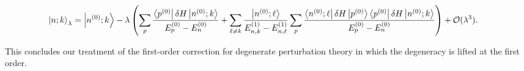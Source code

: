 \begin{align*}
\left| n;k \right\rangle_\lambda &= \left| n^{(0)};k \right\rangle
- \lambda \left( \sum\limits_p \frac{\left\langle p^{(0)} \right|\delta H \left| n^{(0)};k \right\rangle}{E_p^{(0)}-E_n^{(0)}}
+ \sum\limits_{\ell\neq k} \frac{\left| n^{(0)};\ell \right\rangle}{E_{n,k}^{(1)}-E_{n,\ell}^{(1)}} \sum\limits_{p} \frac{\left\langle n^{(0)};\ell \right|\delta H \left| p^{(0)} \right\rangle \left\langle p^{(0)} \right|\delta H\left| n^{(0)};k \right\rangle}{E_p^{(0)}-E_n^{(0)}}
\right) + \mathcal{O} (\lambda^3).
\end{align*}

This concludes our treatment of the first-order correction for degenerate perturbation theory in which the degeneracy is lifted at the first order.

